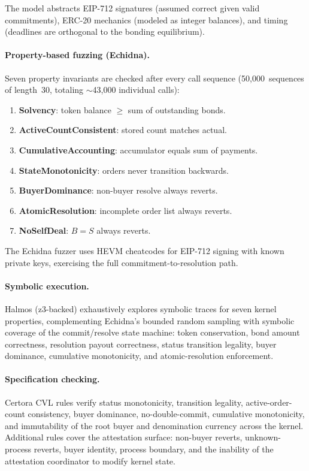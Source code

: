 \documentclass[11pt,a4paper]{article}
\theoremstyle{definition}
\theoremstyle{remark}
\begin{document}
The model abstracts EIP-712 signatures (assumed correct given valid
commitments), ERC-20 mechanics (modeled as integer balances), and
timing (deadlines are orthogonal to the bonding equilibrium).

\paragraph{Property-based fuzzing (Echidna).}
Seven property invariants are checked after every call sequence
(50{,}000~sequences of length~30, totaling $\sim$43{,}000 individual
calls):
\begin{enumerate}[label=\textbf{E\arabic*}]
  \item \textbf{Solvency}: token balance $\geq$ sum of outstanding bonds.
  \item \textbf{ActiveCountConsistent}: stored count matches actual.
  \item \textbf{CumulativeAccounting}: accumulator equals sum of payments.
  \item \textbf{StateMonotonicity}: orders never transition backwards.
  \item \textbf{BuyerDominance}: non-buyer resolve always reverts.
  \item \textbf{AtomicResolution}: incomplete order list always reverts.
  \item \textbf{NoSelfDeal}: $B = S$ always reverts.
\end{enumerate}
The Echidna fuzzer uses HEVM cheatcodes for EIP-712 signing with known
private keys, exercising the full commitment-to-resolution path.

\paragraph{Symbolic execution.}
Halmos (z3-backed) exhaustively explores symbolic traces for
seven kernel properties, complementing Echidna's bounded random
sampling with symbolic coverage of the commit/resolve state machine:
token conservation, bond amount correctness, resolution payout
correctness, status transition legality, buyer dominance,
cumulative monotonicity, and atomic-resolution enforcement.

\paragraph{Specification checking.}
Certora CVL rules verify status monotonicity, transition legality,
active-order-count consistency, buyer dominance, no-double-commit,
cumulative monotonicity, and immutability of the root buyer and
denomination currency across the kernel. Additional rules cover the
attestation surface: non-buyer reverts, unknown-process reverts, buyer
identity, process boundary, and the inability of the attestation
coordinator to modify kernel state.
\end{document}
